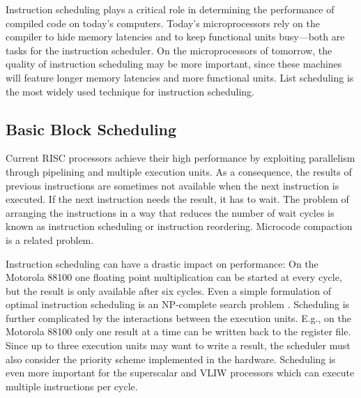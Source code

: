 Instruction scheduling\cite{cooper1998experimental} plays a critical role in determining the performance of compiled code on today’s
computers. Today’s microprocessors rely on the compiler to hide memory latencies and to keep functional
units busy—both are tasks for the instruction scheduler. On the microprocessors of tomorrow, the quality
of instruction scheduling may be more important, since these machines will feature longer memory latencies
and more functional units. List scheduling is the most widely used technique for instruction scheduling.




\subsection{Basic Block Scheduling}


Current RISC processors achieve their high performance by exploiting parallelism through
pipelining and multiple execution units. As a consequence, the results of previous instructions
are sometimes not available when the next instruction is executed. If the next
instruction needs the result, it has to wait. The problem of arranging the instructions
in a way that reduces the number of wait cycles is known as instruction scheduling or
instruction reordering. Microcode compaction is a related problem.

Instruction scheduling can have a drastic impact on performance: On the Motorola
88100 one floating point multiplication can be started at every cycle, but the result is only
available after six cycles. Even a simple formulation of optimal instruction scheduling
is an NP-complete search problem . Scheduling is further complicated by the
interactions between the execution units. E.g., on the Motorola 88100 only one result at
a time can be written back to the register file. Since up to three execution units may want
to write a result, the scheduler must also consider the priority scheme implemented in the
hardware. Scheduling is even more important for the superscalar and VLIW processors
 which can execute multiple instructions per cycle.


